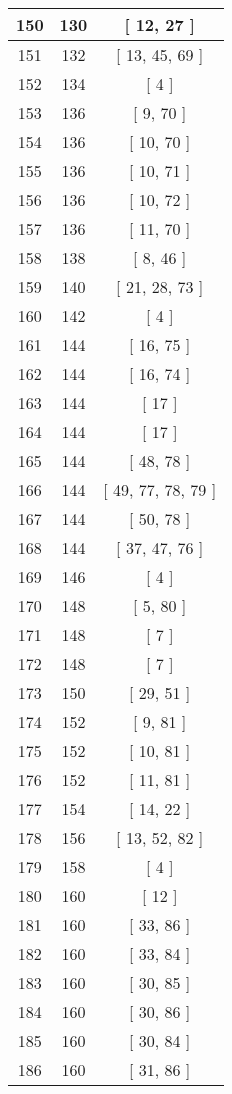 \begin{center}
\begin{longtable}[H]{|| c c c ||}
150 & 130 & [ 12, 27 ]
\\\hline
151 & 132 & [ 13, 45, 69 ]
\\\hline
152 & 134 & [ 4 ]
\\\hline
153 & 136 & [ 9, 70 ]
\\\hline
154 & 136 & [ 10, 70 ]
\\\hline
155 & 136 & [ 10, 71 ]
\\\hline
156 & 136 & [ 10, 72 ]
\\\hline
157 & 136 & [ 11, 70 ]
\\\hline
158 & 138 & [ 8, 46 ]
\\\hline
159 & 140 & [ 21, 28, 73 ]
\\\hline
160 & 142 & [ 4 ]
\\\hline
161 & 144 & [ 16, 75 ]
\\\hline
162 & 144 & [ 16, 74 ]
\\\hline
163 & 144 & [ 17 ]
\\\hline
164 & 144 & [ 17 ]
\\\hline
165 & 144 & [ 48, 78 ]
\\\hline
166 & 144 & [ 49, 77, 78, 79 ]
\\\hline
167 & 144 & [ 50, 78 ]
\\\hline
168 & 144 & [ 37, 47, 76 ]
\\\hline
169 & 146 & [ 4 ]
\\\hline
170 & 148 & [ 5, 80 ]
\\\hline
171 & 148 & [ 7 ]
\\\hline
172 & 148 & [ 7 ]
\\\hline
173 & 150 & [ 29, 51 ]
\\\hline
174 & 152 & [ 9, 81 ]
\\\hline
175 & 152 & [ 10, 81 ]
\\\hline
176 & 152 & [ 11, 81 ]
\\\hline
177 & 154 & [ 14, 22 ]
\\\hline
178 & 156 & [ 13, 52, 82 ]
\\\hline
179 & 158 & [ 4 ]
\\\hline
180 & 160 & [ 12 ]
\\\hline
181 & 160 & [ 33, 86 ]
\\\hline
182 & 160 & [ 33, 84 ]
\\\hline
183 & 160 & [ 30, 85 ]
\\\hline
184 & 160 & [ 30, 86 ]
\\\hline
185 & 160 & [ 30, 84 ]
\\\hline
186 & 160 & [ 31, 86 ]
\\\hline

\end{longtable}
\end{center}
